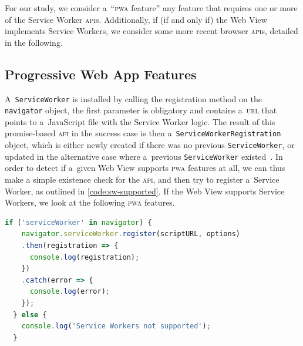 \documentclass[sigconf]{acmart}
\begin{document}
For our study, we consider a~``\textsc{pwa} feature'' any feature that requires 
one or more of the Service Worker \textsc{api}s.
Additionally, if (if and only if) the Web View implements Service Workers,
we consider some more recent browser \textsc{api}s,
detailed in the following.

\subsection{Progressive Web App Features}

A~\texttt{ServiceWorker} is installed by calling the registration method
on the \texttt{navigator} object, the first parameter is obligatory
and contains a~\textsc{url} that points to a~JavaScript file with the Service Worker logic.
The result of this promise-based \textsc{api} in the success case is then
a~\texttt{ServiceWorkerRegistration} object,
which is either newly created if there was no previous \texttt{ServiceWorker},
or updated in the alternative case
where a~previous \texttt{ServiceWorker} existed~\cite{russell2017serviceworkers}.
In order to detect if a~given Web View supports \textsc{pwa} features at all,
we can thus make a simple existence check for the \textsc{api},
and then try to register a~Service Worker, as outlined in \autoref{code:sw-supported}.
If the Web View supports Service Workers, we look at the following \textsc{pwa} features.

\begin{lstlisting}[caption={Checking for Service Worker support.},
  label=code:sw-supported, language=JavaScript, float=htb] 
  if ('serviceWorker' in navigator) { 
    navigator.serviceWorker.register(scriptURL, options)
    .then(registration => {
      console.log(registration);
    })
    .catch(error => {
      console.log(error);
    });
  } else {
    console.log('Service Workers not supported');
  }
\end{lstlisting}
\end{document}
